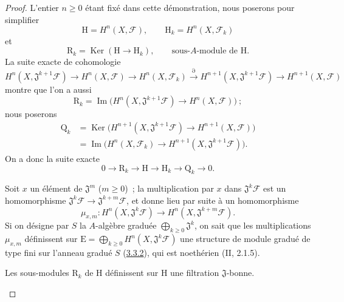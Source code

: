 \begin{proof}
L'entier $n\geq0$ étant fixé dans cette démonstration, nous poserons pour
simplifier
\[
\mathrm H=H^n(X,\mathcal F),\qquad
\mathrm H_k=H^n(X,\mathcal F_k)
\tag{4.1.7.3}\label{III.4.1.7.3-fr}
\]
et
\[
\mathrm R_k=\operatorname{Ker}(\mathrm H\longrightarrow\mathrm H_k),
\qquad\text{sous-$A$-module de $\mathrm H$.}
\tag{4.1.7.4}\label{III.4.1.7.4-fr}
\]
La suite exacte de cohomologie
\[
H^n(X,\mathfrak J^{k+1}\mathcal F)\longrightarrow H^n(X,\mathcal F)
\longrightarrow H^n(X,\mathcal F_k)\xrightarrow{\partial}
H^{n+1}(X,\mathfrak J^{k+1}\mathcal F)
\longrightarrow H^{n+1}(X,\mathcal F)
\]
montre que l'on a aussi
\[
\mathrm R_k=\operatorname{Im}\bigl(
H^n(X,\mathfrak J^{k+1}\mathcal F)\longrightarrow H^n(X,\mathcal F)
\bigr)~;
\]
nous poserons
\[
\begin{aligned}
\mathrm Q_k
&=\operatorname{Ker}\bigl(H^{n+1}(X,\mathfrak J^{k+1}\mathcal F)
\longrightarrow H^{n+1}(X,\mathcal F)\bigr)\\
&=\operatorname{Im}\bigl(H^n(X,\mathcal F_k)
\longrightarrow H^{n+1}(X,\mathfrak J^{k+1}\mathcal F)\bigr).
\end{aligned}
\tag{4.1.7.5}\label{III.4.1.7.5-fr}
\]
On a donc la suite exacte
\[
0\longrightarrow\mathrm R_k\longrightarrow\mathrm H
\longrightarrow\mathrm H_k\longrightarrow\mathrm Q_k\longrightarrow0.
\tag{4.1.7.6}\label{III.4.1.7.6-fr}
\]

\begin{env}[4.1.7.7]
\label{III.4.1.7.7-fr}
Soit $x$ un élément de $\mathfrak J^m$ ($m\geq0$)~; la multiplication par
$x$ dans $\mathfrak J^k\mathcal F$ est un homomorphisme
$\mathfrak J^k\mathcal F\to\mathfrak J^{k+m}\mathcal F$, et donne lieu
par suite à un homomorphisme
\[
\mu_{x,m}:H^n(X,\mathfrak J^k\mathcal F)
\longrightarrow H^n(X,\mathfrak J^{k+m}\mathcal F).
\tag{4.1.7.8}\label{III.4.1.7.8-fr}
\]
Si on désigne par $S$ la $A$-algèbre graduée
$\bigoplus_{k\geq0}\mathfrak J^k$, on sait que les multiplications
$\mu_{x,m}$ définissent sur
$\mathrm E=\bigoplus_{k\geq0}H^n(X,\mathfrak J^k\mathcal F)$ une
structure de module gradué de type fini sur l'anneau gradué $S$
(\hyperref[III.3.3.2-fr]{3.3.2}), qui est noethérien (II, 2.1.5).
\end{env}

\begin{lemma}[4.1.7.9]
\label{III.4.1.7.9-fr}
Les sous-modules $\mathrm R_k$ de $\mathrm H$ définissent sur $\mathrm H$
une filtration $\mathfrak J$-bonne.
\end{lemma}


\end{proof}
